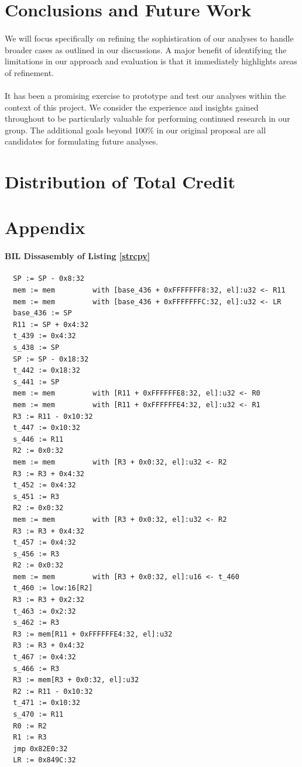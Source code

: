 \documentclass[letterpaper,11pt]{article}
\begin{document}
\section{Conclusions and Future Work}
\paragraph{}
We will focus specifically on refining the sophistication of our analyses
to handle broader cases as outlined in our discussions. A major benefit of
identifying the limitations in our approach and evaluation is that it
immediately highlights areas of refinement.

\paragraph{}
It has been a promising exercise to prototype and test our
analyses within the context of this project. We consider the experience and
insights gained throughout to be particularly valuable for performing continued
research in our group. The additional goals beyond 100\% in our original
proposal are all candidates for formulating future analyses.


\section{Distribution of Total Credit}

\clearpage

\appendix
\section{Appendix}
\label{appa}
\paragraph{BIL Dissasembly of Listing \ref{strcpy}}

\begin{verbatim}
  SP := SP - 0x8:32
  mem := mem         with [base_436 + 0xFFFFFFF8:32, el]:u32 <- R11
  mem := mem         with [base_436 + 0xFFFFFFFC:32, el]:u32 <- LR
  base_436 := SP
  R11 := SP + 0x4:32
  t_439 := 0x4:32
  s_438 := SP
  SP := SP - 0x18:32
  t_442 := 0x18:32
  s_441 := SP
  mem := mem         with [R11 + 0xFFFFFFE8:32, el]:u32 <- R0
  mem := mem         with [R11 + 0xFFFFFFE4:32, el]:u32 <- R1
  R3 := R11 - 0x10:32
  t_447 := 0x10:32
  s_446 := R11
  R2 := 0x0:32
  mem := mem         with [R3 + 0x0:32, el]:u32 <- R2
  R3 := R3 + 0x4:32
  t_452 := 0x4:32
  s_451 := R3
  R2 := 0x0:32
  mem := mem         with [R3 + 0x0:32, el]:u32 <- R2
  R3 := R3 + 0x4:32
  t_457 := 0x4:32
  s_456 := R3
  R2 := 0x0:32
  mem := mem         with [R3 + 0x0:32, el]:u16 <- t_460
  t_460 := low:16[R2]
  R3 := R3 + 0x2:32
  t_463 := 0x2:32
  s_462 := R3
  R3 := mem[R11 + 0xFFFFFFE4:32, el]:u32
  R3 := R3 + 0x4:32
  t_467 := 0x4:32
  s_466 := R3
  R3 := mem[R3 + 0x0:32, el]:u32
  R2 := R11 - 0x10:32
  t_471 := 0x10:32
  s_470 := R11
  R0 := R2
  R1 := R3
  jmp 0x82E0:32
  LR := 0x849C:32
\end{verbatim}
\end{document}
